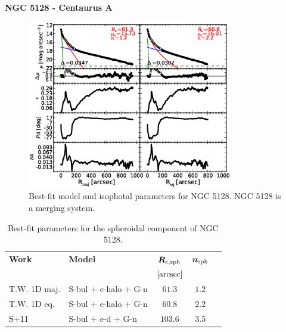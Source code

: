 \documentclass[preprint2]{emulateapj}
\newcommand{\fitfigurewidth}{0.8\textwidth}
\begin{document}
  \clearpage\newpage\noindent

  {\bf NGC 5128 - Centaurus A \\}

  \begin{figure}[h]
  \begin{center}
  \includegraphics[width=\fitfigurewidth]{images/n5128_1Dfit.eps}
  \caption{Best-fit model and isophotal parameters for NGC 5128.
  NGC 5128 is a merging system. }
  \end{center}
  \end{figure}

  \begin{table}[h]
  \small
  \caption{Best-fit parameters for the spheroidal component of NGC 5128.}
  \begin{center}
  \begin{tabular}{llccc}
  \hline
  {\bf Work} & {\bf Model}   & $\bm R_{\rm e,sph}$    & $\bm n_{\rm sph}$ \\
    &  &  $[\rm arcsec]$ & \\
  \hline
  T.W. 1D maj. & S-bul + e-halo + G-n & $61.3$  &  $1.2$ \\
  T.W. 1D eq.  & S-bul + e-halo + G-n & $60.8$  &  $2.2$ \\
  \hline
  S+11         & S-bul + e-d + G-n    & $103.6$  &  $3.5$ \\
  \hline
  \end{tabular}
  \end{center}
  \label{tab:n5128}
  \tablecomments{}
  \end{table}
\end{document}
